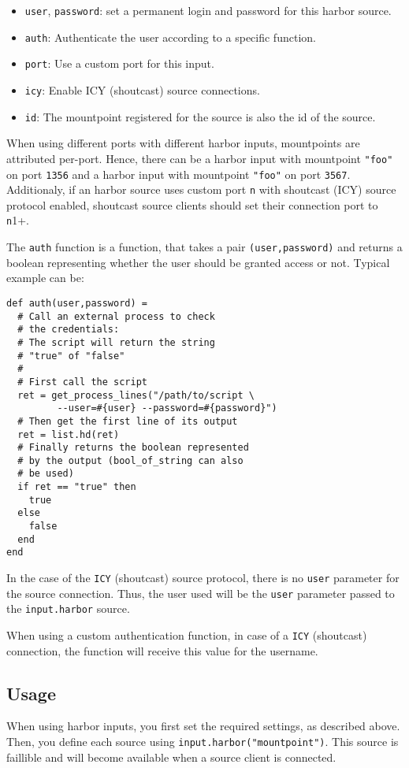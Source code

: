 \begin{itemize}
\item \verb+user+, \verb+password+: set a permanent login and password for this harbor source.
\item \verb+auth+: Authenticate the user according to a specific function.
\item \verb+port+: Use a custom port for this input.
\item \verb+icy+: Enable ICY (shoutcast) source connections.
\item \verb+id+: The mountpoint registered for the source is also the id of the source.

\end{itemize}
When using different ports with different harbor inputs, mountpoints are attributed
per-port. Hence, there can be a harbor input with mountpoint \verb+"foo"+ on port \verb+1356+
and a harbor input with mountpoint \verb+"foo"+ on port \verb+3567+. Additionaly, if an harbor 
source uses custom port \verb+n+ with shoutcast (ICY) source protocol enabled, shoutcast
source clients should set their connection port to \verb+n+1+.

The \verb+auth+ function is a function, that takes a pair \verb+(user,password)+ and returns a boolean representing whether the user 
should be granted access or not. Typical example can be:

\begin{verbatim}
def auth(user,password) = 
  # Call an external process to check 
  # the credentials:
  # The script will return the string 
  # "true" of "false"
  #
  # First call the script
  ret = get_process_lines("/path/to/script \
         --user=#{user} --password=#{password}")
  # Then get the first line of its output
  ret = list.hd(ret)
  # Finally returns the boolean represented 
  # by the output (bool_of_string can also 
  # be used)
  if ret == "true" then
    true
  else
    false
  end
end
\end{verbatim}
In the case of the \verb+ICY+ (shoutcast) source protocol, there is no \verb+user+ parameter 
for the source connection. Thus, the user used will be the \verb+user+ parameter passed 
to the \verb+input.harbor+ source.

When using a custom authentication function, in case of a \verb+ICY+ (shoutcast) connection, 
the function will receive this value for the username.

\subsection{Usage}
When using harbor inputs, you first set the required settings, as described above. Then, you define each source using \verb+input.harbor("mountpoint")+. This source is faillible and will become available when a source client is connected. 

